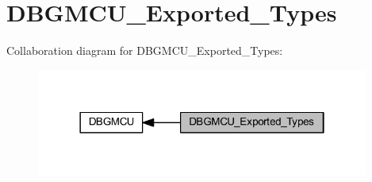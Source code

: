 \hypertarget{group___d_b_g_m_c_u___exported___types}{}\section{D\+B\+G\+M\+C\+U\+\_\+\+Exported\+\_\+\+Types}
\label{group___d_b_g_m_c_u___exported___types}
Collaboration diagram for D\+B\+G\+M\+C\+U\+\_\+\+Exported\+\_\+\+Types\+:
\nopagebreak
\begin{figure}[H]
\begin{center}
\leavevmode
\includegraphics[width=310pt]{group___d_b_g_m_c_u___exported___types}
\end{center}
\end{figure}
